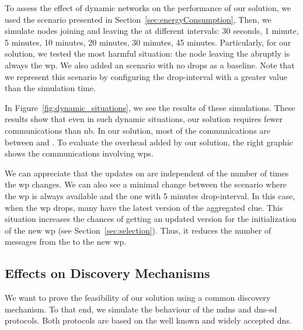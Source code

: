 

To assess the effect of dynamic networks on the performance of our solution, we used the scenario presented in Section~\ref{sec:energyConsumption},
Then, we simulate nodes joining and leaving the \Space{} at different intervals: 30 seconds, 1 minute, 5 minutes, 10 minutes, 20 minutes, 30 minutes, 45 minutes.
Particularly, for our solution, we tested the most harmful situation: the node leaving the \Space{} abruptly is always the \ac{wp}.
We also added an scenario with no drops as a baseline.
Note that we represent this scenario by configuring the drop-interval with a greater value than the simulation time.

In Figure~\ref{fig:dynamic_situations}, we see the results of these simulations.
These results show that even in such dynamic situations, our solution requires fewer communications than \acl{nb}.
In our solution, most of the communications are between \consumers{} and \providers{}.
To evaluate the overhead added by our solution, the right graphic shows the communications involving \acp{wp}.

We can appreciate that the updates on \consumers{} are independent of the number of times the \ac{wp} changes.
We can also see a minimal change between the scenario where the \ac{wp} is always available and the one with 5 minutes drop-interval.
In this case, when the \ac{wp} drops, many \consumers{} have the latest version of the aggregated clue.
This situation increases the chances of getting an updated version for the initialization of the new \ac{wp} (see Section~\ref{sec:selection}).
Thus, it reduces the number of messages from the \providers{} to the new \ac{wp}.


\subsection{Effects on Discovery Mechanisms}
\label{sec:mdns}
We want to prove the feasibility of our solution using a common discovery mechanism.
To that end, we simulate the behaviour of the \ac{mdns} and \ac{dns-sd}  protocols.
Both protocols are based on the well known and widely accepted \ac{dns}.

